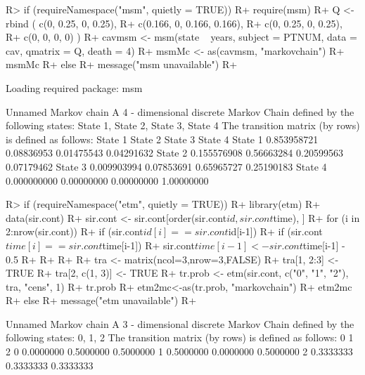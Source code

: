 \documentclass[
  nojss]{jss}
\begin{document}
\begin{CodeChunk}

\begin{CodeInput}
R> if (requireNamespace("msm", quietly = TRUE)) {
R+ require(msm)
R+ Q <- rbind ( c(0, 0.25, 0, 0.25),
R+              c(0.166, 0, 0.166, 0.166),
R+              c(0, 0.25, 0, 0.25),
R+              c(0, 0, 0, 0) )
R+ cavmsm <- msm(state ~ years, subject = PTNUM, data = cav, qmatrix = Q, death = 4)
R+ msmMc <- as(cavmsm, "markovchain")
R+ msmMc
R+   } else {
R+   message("msm unavailable")
R+   }
\end{CodeInput}

\begin{CodeOutput}
Loading required package: msm
\end{CodeOutput}

\begin{CodeOutput}
Unnamed Markov chain 
 A  4 - dimensional discrete Markov Chain defined by the following states: 
 State 1, State 2, State 3, State 4 
 The transition matrix  (by rows)  is defined as follows: 
            State 1    State 2    State 3    State 4
State 1 0.853958721 0.08836953 0.01475543 0.04291632
State 2 0.155576908 0.56663284 0.20599563 0.07179462
State 3 0.009903994 0.07853691 0.65965727 0.25190183
State 4 0.000000000 0.00000000 0.00000000 1.00000000
\end{CodeOutput}
\end{CodeChunk}

\begin{CodeChunk}

\begin{CodeInput}
R> if (requireNamespace("etm", quietly = TRUE)) {
R+ library(etm)
R+ data(sir.cont)
R+ sir.cont <- sir.cont[order(sir.cont$id, sir.cont$time), ]
R+ for (i in 2:nrow(sir.cont)) {
R+   if (sir.cont$id[i]==sir.cont$id[i-1]) {
R+     if (sir.cont$time[i]==sir.cont$time[i-1]) {
R+       sir.cont$time[i-1] <- sir.cont$time[i-1] - 0.5
R+     }
R+   }
R+ }
R+ tra <- matrix(ncol=3,nrow=3,FALSE)
R+ tra[1, 2:3] <- TRUE
R+ tra[2, c(1, 3)] <- TRUE
R+ tr.prob <- etm(sir.cont, c("0", "1", "2"), tra, "cens", 1)
R+ tr.prob
R+ etm2mc<-as(tr.prob, "markovchain")
R+ etm2mc
R+   } else {
R+   message("etm unavailable")
R+ }
\end{CodeInput}

\begin{CodeOutput}
Unnamed Markov chain 
 A  3 - dimensional discrete Markov Chain defined by the following states: 
 0, 1, 2 
 The transition matrix  (by rows)  is defined as follows: 
          0         1         2
0 0.0000000 0.5000000 0.5000000
1 0.5000000 0.0000000 0.5000000
2 0.3333333 0.3333333 0.3333333
\end{CodeOutput}
\end{CodeChunk}
\end{document}
